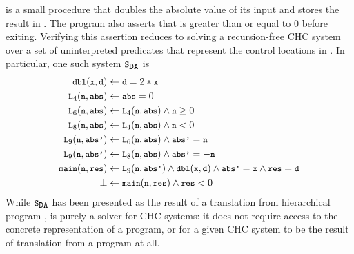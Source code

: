 \begin{figure}[t]
  \centering
  \begin{floatrow}[2]
    {  }
      {}
  \end{floatrow}
\end{figure}
%
 is a small procedure that doubles the absolute value of
its input and stores the result in .
The program also asserts that  is greater than or equal to $0$
before exiting.
Verifying this assertion reduces to solving a recursion-free
CHC system over a set of uninterpreted predicates that represent
the control locations in .
%
In particular, one such system $\mcchc$ is
%
\begin{align}
\label{chc}
\cc{dbl}(\cc{x}, \cc{d}) &\gets \cc{d} = 2 * \cc{x} \\
  \cc{L}_4(\cc{n}, \cc{abs}) &\gets  \cc{abs} = 0 \\
  \cc{L}_6(\cc{n}, \cc{abs}) &\gets \cc{L}_4(\cc{n}, \cc{abs}) \land \cc{n} \ge 0 \\
  \cc{L}_8(\cc{n}, \cc{abs}) &\gets \cc{L}_4(\cc{n}, \cc{abs}) \land \cc{n} < 0 \\
  \cc{L}_9(\cc{n}, \cc{abs'}) &\gets \cc{L}_6(\cc{n},\cc{abs}) \land \cc{abs'} = \cc{n} \\
   \cc{L}_9(\cc{n}, \cc{abs'}) &\gets \cc{L}_8(\cc{n},\cc{abs}) \land \cc{abs'} = -\cc{n} \\
   \cc{main}(\cc{n},\cc{res}) &\gets \cc{L}_9(\cc{n}, \cc{abs'}) \land
                                     \cc{dbl}(\cc{x}, \cc{d})
    \land \cc{abs'} = \cc{x} \land \cc{res} = \cc{d} \\
    \bot &\gets \cc{main}(\cc{n}, \cc{res}) \land \cc{res} < 0 
\end{align}
%
While $\mcchc$ has been presented as the result
of a translation from hierarchical program , \sys is
purely a solver for CHC systems: it does not require access to the
concrete representation of a program, or for a given CHC system to be
the result of translation from a program at all.

